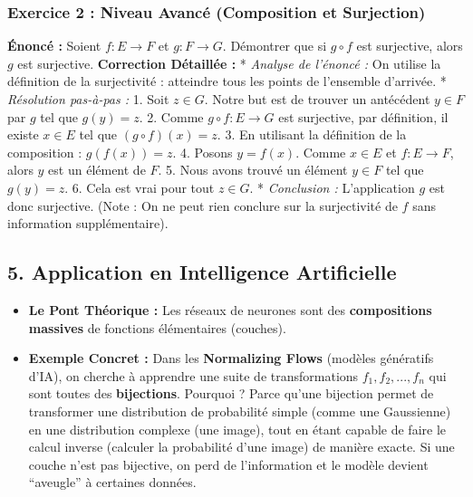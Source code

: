 \documentclass[12pt,a4paper]{report}
\providecommand{\tightlist}{%
  \setlength{\itemsep}{0pt}\setlength{\parskip}{0pt}}
\begin{document}
\subsubsection{Exercice 2 : Niveau Avancé (Composition et
Surjection)}\label{exercice-2-niveau-avancuxe9-composition-et-surjection}

\textbf{Énoncé :} Soient \(f : E \to F\) et \(g : F \to G\). Démontrer
que si \(g \circ f\) est surjective, alors \(g\) est surjective.
\textbf{Correction Détaillée :} * \emph{Analyse de l'énoncé :} On
utilise la définition de la surjectivité : atteindre tous les points de
l'ensemble d'arrivée. * \emph{Résolution pas-à-pas :} 1. Soit
\(z \in G\). Notre but est de trouver un antécédent \(y \in F\) par
\(g\) tel que \(g(y) = z\). 2. Comme \(g \circ f : E \to G\) est
surjective, par définition, il existe \(x \in E\) tel que
\((g \circ f)(x) = z\). 3. En utilisant la définition de la composition
: \(g(f(x)) = z\). 4. Posons \(y = f(x)\). Comme \(x \in E\) et
\(f : E \to F\), alors \(y\) est un élément de \(F\). 5. Nous avons
trouvé un élément \(y \in F\) tel que \(g(y) = z\). 6. Cela est vrai
pour tout \(z \in G\). * \emph{Conclusion :} L'application \(g\) est
donc surjective. (Note : On ne peut rien conclure sur la surjectivité de
\(f\) sans information supplémentaire).

\subsection{5. Application en Intelligence
Artificielle}\label{application-en-intelligence-artificielle}

\begin{itemize}
\tightlist
\item
  \textbf{Le Pont Théorique :} Les réseaux de neurones sont des
  \textbf{compositions massives} de fonctions élémentaires (couches).
\item
  \textbf{Exemple Concret :} Dans les \textbf{Normalizing Flows}
  (modèles génératifs d'IA), on cherche à apprendre une suite de
  transformations \(f_1, f_2, ..., f_n\) qui sont toutes des
  \textbf{bijections}. Pourquoi ? Parce qu'une bijection permet de
  transformer une distribution de probabilité simple (comme une
  Gaussienne) en une distribution complexe (une image), tout en étant
  capable de faire le calcul inverse (calculer la probabilité d'une
  image) de manière exacte. Si une couche n'est pas bijective, on perd
  de l'information et le modèle devient ``aveugle'' à certaines données.
\end{itemize}
\end{document}
